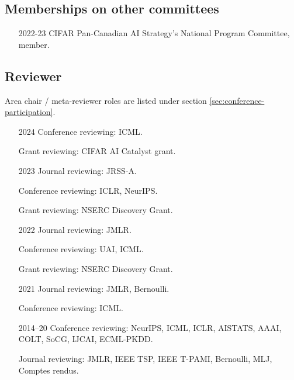 \documentclass[10pt]{article}
\begin{document}
\nasubsection{%
  \subsection{Memberships on scholarly committees} %

  Not applicable.
}%

\subsection{Memberships on other committees} %
\begin{itemize}[leftmargin=5em]
\item[2022-23] {CIFAR Pan-Canadian AI Strategy's National Program Committee, member.}
\end{itemize}

%

\subsection{Reviewer} \label{sec:reviewer} %

Area chair / meta-reviewer roles are listed under section \ref{sec:conference-participation}.

\begin{itemize}[leftmargin=5em]
  \item[2024] Conference reviewing: ICML.
  \item[] Grant reviewing: CIFAR AI Catalyst grant.
  \item[2023] Journal reviewing: {JRSS-A}.
  \item[    ] Conference reviewing: {ICLR, NeurIPS}.
  \item[] Grant reviewing: NSERC Discovery Grant.
  \item[2022] Journal reviewing: {JMLR}.
  \item[    ] Conference reviewing: {UAI}, {ICML}.
  \item[    ] Grant reviewing: NSERC Discovery Grant.
  \item[2021] Journal reviewing: {JMLR}, {Bernoulli}.
  \item[] Conference reviewing: ICML.
  \item[2014--20] Conference reviewing: NeurIPS, ICML, ICLR, AISTATS, AAAI, COLT, SoCG, IJCAI, ECML-PKDD.
  \item[] Journal reviewing: JMLR, IEEE TSP, IEEE T-PAMI, Bernoulli, MLJ, Comptes rendus.
\end{itemize}
\end{document}
